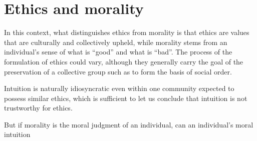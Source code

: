 \documentclass{scrartcl}
\begin{document}
\section{Ethics and morality}

In this context, what distinguishes ethics from morality is that ethics are values that are culturally and collectively upheld, while morality stems from an individual's sense of what is ``good'' and what is ``bad''. The process of the formulation of ethics could vary, although they generally carry the goal of the preservation of a collective group such as to form the basis of social order.

Intuition is naturally idiosyncratic even within one community expected to possess similar ethics, which is sufficient to let us conclude that intuition is not trustworthy for ethics.

But if morality is the moral judgment of an individual, can an individual's moral intuition

\printbibliography
\end{document}

